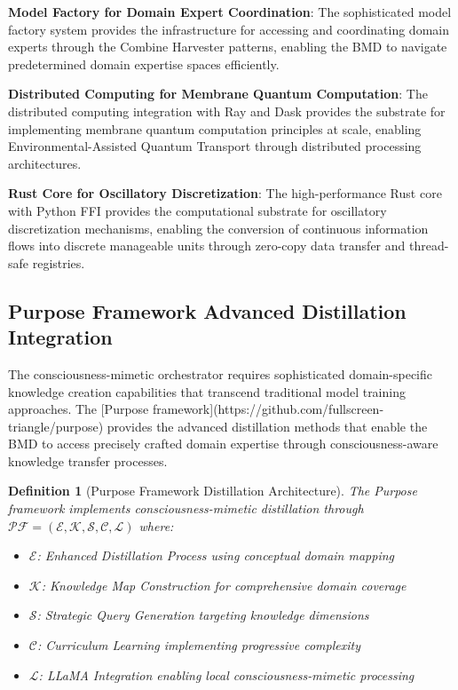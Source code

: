\documentclass[12pt,a4paper]{article}
\newtheorem{definition}[theorem]{Definition}
\begin{document}
\textbf{Model Factory for Domain Expert Coordination}: The sophisticated model factory system provides the infrastructure for accessing and coordinating domain experts through the Combine Harvester patterns, enabling the BMD to navigate predetermined domain expertise spaces efficiently.

\textbf{Distributed Computing for Membrane Quantum Computation}: The distributed computing integration with Ray and Dask provides the substrate for implementing membrane quantum computation principles at scale, enabling Environmental-Assisted Quantum Transport through distributed processing architectures.

\textbf{Rust Core for Oscillatory Discretization}: The high-performance Rust core with Python FFI provides the computational substrate for oscillatory discretization mechanisms, enabling the conversion of continuous information flows into discrete manageable units through zero-copy data transfer and thread-safe registries.

\subsection{Purpose Framework Advanced Distillation Integration}

The consciousness-mimetic orchestrator requires sophisticated domain-specific knowledge creation capabilities that transcend traditional model training approaches. The [Purpose framework](https://github.com/fullscreen-triangle/purpose) provides the advanced distillation methods that enable the BMD to access precisely crafted domain expertise through consciousness-aware knowledge transfer processes.

\begin{definition}[Purpose Framework Distillation Architecture]
The Purpose framework implements consciousness-mimetic distillation through $\mathcal{PF} = (\mathcal{E}, \mathcal{K}, \mathcal{S}, \mathcal{C}, \mathcal{L})$ where:
\begin{itemize}
\item $\mathcal{E}$: Enhanced Distillation Process using conceptual domain mapping
\item $\mathcal{K}$: Knowledge Map Construction for comprehensive domain coverage
\item $\mathcal{S}$: Strategic Query Generation targeting knowledge dimensions
\item $\mathcal{C}$: Curriculum Learning implementing progressive complexity
\item $\mathcal{L}$: LLaMA Integration enabling local consciousness-mimetic processing
\end{itemize}
\end{definition}
\end{document}
